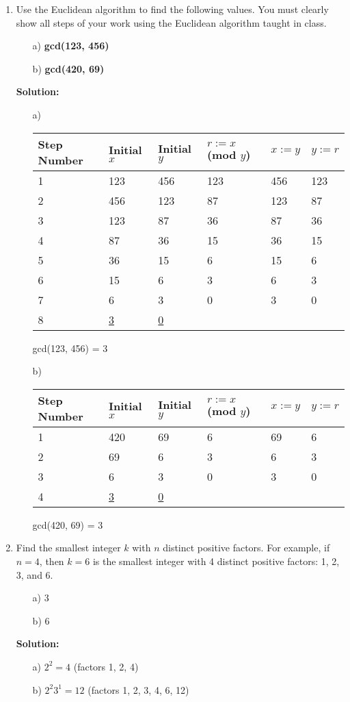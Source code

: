 \documentclass{article}
\newenvironment{solution}
{
\par
\color{blue}
\textbf{Solution:}
}
{
\par
}
\begin{document}
\begin{enumerate}
\item Use the Euclidean algorithm to find the following values. You must clearly show all steps of your work using the Euclidean algorithm taught in class.
\begin{enumerate}
    \item[a)] \textbf{gcd(123, 456)}
    \item[b)] \textbf{gcd(420, 69)} %
\end{enumerate}
\begin{solution}
\begin{enumerate}
    \item[a)]
    \begin{tabular}{l|l|l||l|l|l}
        Step Number & Initial $x$ & Initial $y$ & $r := x$ (mod $y$) & $x := y$ & $y := r$ \\ \hline
        1 & 123 & 456 & 123 & 456 & 123\\
        2 & 456 & 123 & 87 & 123 & 87\\
        3 & 123 & 87 & 36 & 87 & 36\\
        4 & 87 & 36 & 15 & 36 & 15\\
        5 & 36 & 15 & 6 & 15 & 6\\
        6 & 15 & 6 & 3 & 6 & 3\\
        7 & 6 & 3 & 0 & 3 & 0\\
        8 & \underline{3} & \underline{0}
    \end{tabular}
    gcd(123, 456) = 3
    
    \item[b)]
    \begin{tabular}{l|l|l||l|l|l}
        Step Number & Initial $x$ & Initial $y$ & $r := x$ (mod $y$) & $x := y$ & $y := r$ \\ \hline
        1 & 420 & 69 & 6 & 69 & 6\\
        2 & 69 & 6 & 3 & 6 & 3\\
        3 & 6 & 3 & 0 & 3 & 0\\
        4 & \underline{3} & \underline{0}
    \end{tabular}
    gcd(420, 69) = 3
\end{enumerate}
\end{solution}

\item Find the smallest integer $k$ with $n$ distinct positive factors. For example, if $n = 4$, then $k = 6$ is the smallest integer with 4 distinct positive factors: 1, 2, 3, and 6.
\begin{enumerate}
    \item[a)] 3
    \item[b)] 6
\end{enumerate}
\begin{solution}
\begin{enumerate}
    \item[a)] $2^2 = 4$ (factors 1, 2, 4)
    \item[b)] $2^2 3^1 = 12$ (factors 1, 2, 3, 4, 6, 12)
\end{enumerate}
\end{solution}


\end{enumerate}
\end{document}

